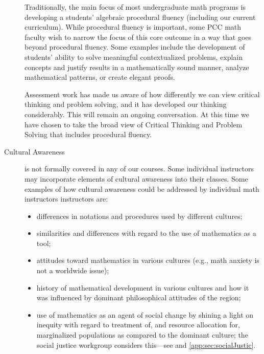 \begin{description}
	Traditionally, the main focus of most undergraduate math programs is developing
	a students' algebraic procedural fluency (including our current curriculum).
	While procedural fluency is important, some PCC math faculty wish to narrow the
	focus of this core outcome in a way that goes beyond procedural fluency. Some
	examples include the development of students' ability to solve meaningful
	contextualized problems, explain concepts and justify results in a
	mathematically sound manner, analyze mathematical patterns, or create elegant
	proofs.

	Assessment work has made us aware of how differently we can view critical
	thinking and problem solving, and it has developed our thinking considerably.
	This will remain an ongoing conversation. At this time we have chosen to take
	the broad view of Critical Thinking and Problem Solving that includes
	procedural fluency.

	\item[Cultural Awareness] is not formally covered in any of our courses.  Some
	individual instructors may incorporate elements of cultural awareness into
	their classes.  Some examples of how cultural awareness could be addressed by
	individual math instructors instructors are:
	\begin{itemize}
		\item differences in notations and procedures used by different cultures;
		\item similarities and differences with regard to the use of mathematics as a
		tool;
		\item attitudes toward mathematics in various cultures (e.g., math anxiety is
		not a worldwide issue);
		\item history of mathematical  development in various cultures and how it was
		influenced by dominant philosophical attitudes of the region;
		\item use of mathematics as an agent of social change by shining a light on
		inequity with regard to treatment of, and resource allocation for,
		marginalized populations as compared to the dominant culture; the social
		justice workgroup considers this---see  and
		\vref{app:sec:socialJustic}.
	\end{itemize}


\end{description}
